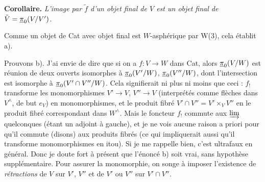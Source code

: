 \noindent\textbf{Corollaire.} \textit{L'image par $\tilde{f}$ d'un objet final de $V$ est un objet final de $\tilde{V} = \underline{\pi}_0(V/V')$.}

Comme un objet de Cat avec objet final est $W$-asphérique par W(3), cela établit a).

Prouvons b). J'ai envie de dire que si on a $f : V \longrightarrow W$ dans Cat, alors $\underline{\pi}_0(V/W)$ est réunion de deux ouverts isomorphes à $\underline{\pi}_0(V'/W)$, $\underline{\pi}_0(V''/W)$, dont l'intersection est isomorphe à $\underline{\pi}_0(V'\cap V''/W)$. Cela signifierait ni plus ni
moins que ceci : $f_!$ transforme les monomorphismes $V' \longrightarrow V$, $V'' \longrightarrow V$ (interprétés comme flèches dans $V^\wedge$, de but $e_V$) en monomorphismes, et le produit fibré $V'\cap V'' = V' \times_V V''$ en le produit fibré correspondant dans $W^\wedge$. Mais le foncteur $f_!$ commute aux $\varinjlim$ quelconques (étant un adjoint à gauche), et je ne vois aucune raison a priori pour qu'il commute (disons) aux produits fibrés (ce qui impliquerait aussi qu'il transforme monomorphismes en itou). Si je me rappelle bien, c'est ultrafaux en général. Donc je doute fort à présent que l'énoncé b) soit vrai, sans hypothèse supplémentaire. Pour assurer la monomorphie, on songe à imposer l'existence de \textit{rétractions} de $V$ sur $V'$, $V''$ et de $V'$ ou $V''$ sur $V'\cap V''$.

